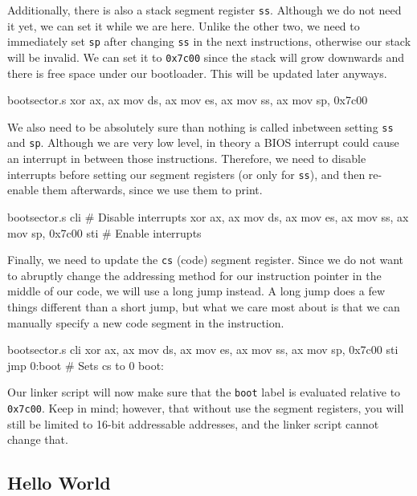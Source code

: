 \documentclass{article}
\begin{document}
Additionally, there is also a stack segment register \Verb|ss|. Although we do not need it yet, we can set it
while we are here. Unlike the other two, we need to immediately set \Verb|sp| after changing \Verb|ss| in the
next instructions, otherwise our stack will be invalid. We can set it to \Verb|0x7c00| since the stack will
grow downwards and there is free space under our bootloader. This will be updated later anyways.

\begin{gas}{bootsector.s}
	xor ax, ax
	mov ds, ax
	mov es, ax
	mov ss, ax
	mov sp, 0x7c00
\end{gas}

We also need to be absolutely sure than nothing is called inbetween setting \Verb|ss| and \Verb|sp|. Although
we are very low level, in theory a BIOS interrupt could cause an interrupt in between those instructions.
Therefore, we need to disable interrupts before setting our segment registers (or only for \Verb|ss|), and
then re-enable them afterwards, since we use them to print.

\begin{gas}{bootsector.s}
	cli # Disable interrupts
	xor ax, ax
	mov ds, ax
	mov es, ax
	mov ss, ax
	mov sp, 0x7c00
	sti # Enable interrupts
\end{gas}

Finally, we need to update the \Verb|cs| (code) segment register. Since we do not want to abruptly change
the addressing method for our instruction pointer in the middle of our code, we will use a long jump instead.
A long jump does a few things different than a short jump, but what we care most about is that we can manually
specify a new code segment in the instruction.

\begin{gas}{bootsector.s}
		cli
		xor ax, ax
		mov ds, ax
		mov es, ax
		mov ss, ax
		mov sp, 0x7c00
		sti
		jmp 0:boot # Sets cs to 0
	boot:
\end{gas}

Our linker script will now make sure that the \Verb|boot| label is evaluated relative to \Verb|0x7c00|. Keep
in mind; however, that without use the segment registers, you will still be limited to 16-bit addressable
addresses, and the linker script cannot change that.

\subsection{Hello World}
\end{document}
